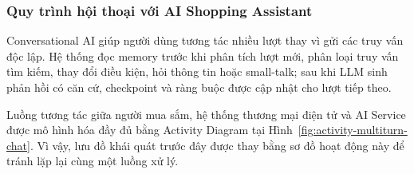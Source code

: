 \subsubsection{Quy trình hội thoại với AI Shopping Assistant}

Conversational AI giúp người dùng tương tác nhiều lượt thay vì gửi các truy vấn độc lập. Hệ thống đọc memory trước khi phân tích lượt mới, phân loại truy vấn tìm kiếm, thay đổi điều kiện, hỏi thông tin hoặc small-talk; sau khi LLM sinh phản hồi có căn cứ, checkpoint và ràng buộc được cập nhật cho lượt tiếp theo.

Luồng tương tác giữa người mua sắm, hệ thống thương mại điện tử và AI Service được mô hình hóa đầy đủ bằng Activity Diagram tại Hình~\ref{fig:activity-multiturn-chat}. Vì vậy, lưu đồ khái quát trước đây được thay bằng sơ đồ hoạt động này để tránh lặp lại cùng một luồng xử lý.


